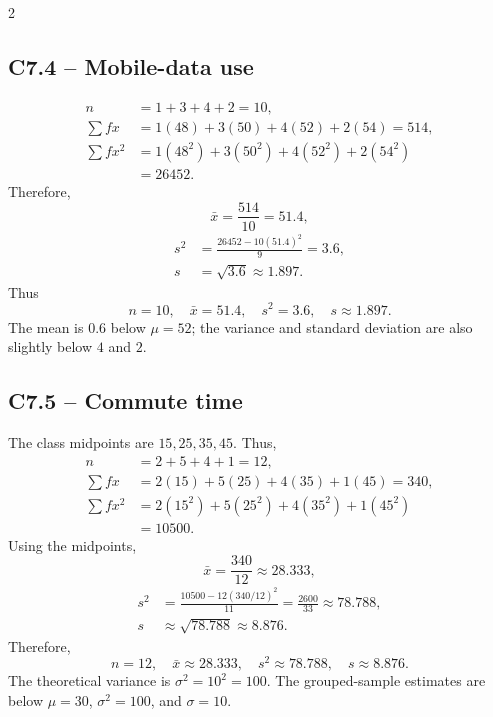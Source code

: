\begin{multicols}{2}

\subsection*{C7.4 -- Mobile-data use}
\label{subsec:c7-solution-mobile-data}

\[
\begin{aligned}
	n&=1+3+4+2=10,\\
	\sum fx&=1(48)+3(50)+4(52)+2(54)=514,\\
	\sum fx^2&=1(48^2)+3(50^2)+4(52^2)+2(54^2)\\
	&=26452.
\end{aligned}
\]
Therefore,
\[
	\bar{x}=\frac{514}{10}=51.4,
\]
\[
	\begin{aligned}
	s^2&=\frac{26452-10(51.4)^2}{9}=3.6,\\
	s&=\sqrt{3.6}\approx1.897.
	\end{aligned}
\]
Thus
\[
\boxed{n=10,\quad\bar{x}=51.4,\quad s^2=3.6,\quad s\approx1.897.}
\]
The mean is $0.6$ below $\mu=52$; the variance and standard deviation are
also slightly below $4$ and $2$.


\subsection*{C7.5 -- Commute time}
\label{subsec:c7-solution-commute}

The class midpoints are $15,25,35,45$. Thus,
\[
\begin{aligned}
	n&=2+5+4+1=12,\\
	\sum fx&=2(15)+5(25)+4(35)+1(45)=340,\\
	\sum fx^2&=2(15^2)+5(25^2)+4(35^2)+1(45^2)\\
	&=10500.
\end{aligned}
\]
Using the midpoints,
\[
	\bar{x}=\frac{340}{12}\approx28.333,
\]
\[
	\begin{aligned}
	s^2&=\frac{10500-12(340/12)^2}{11}
	=\frac{2600}{33}\approx78.788,\\
	s&\approx\sqrt{78.788}\approx8.876.
	\end{aligned}
\]
Therefore,
\[
\boxed{n=12,\quad\bar{x}\approx28.333,\quad s^2\approx78.788,
	\quad s\approx8.876.}
\]
The theoretical variance is $\sigma^2=10^2=100$. The grouped-sample
estimates are below $\mu=30$, $\sigma^2=100$, and $\sigma=10$.


\end{multicols}
